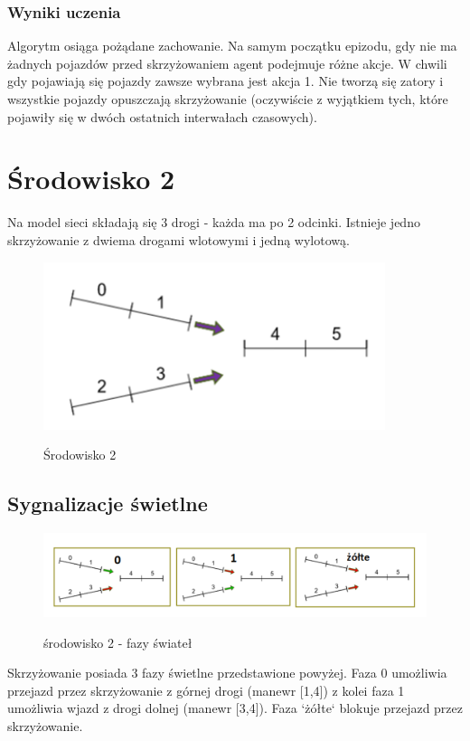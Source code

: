 \documentclass[12pt]{book}
\theoremstyle{plain}
\begin{document}
\subsubsection{Wyniki uczenia}
Algorytm osiąga pożądane zachowanie. Na samym początku epizodu, gdy nie ma żadnych pojazdów przed skrzyżowaniem agent podejmuje różne akcje. W chwili gdy pojawiają się pojazdy zawsze wybrana jest akcja 1. Nie tworzą się zatory i wszystkie pojazdy opuszczają skrzyżowanie (oczywiście z wyjątkiem tych, które pojawiły się w dwóch ostatnich interwałach czasowych).
\section{Środowisko 2}
Na model sieci składają się 3 drogi - każda ma po 2 odcinki. Istnieje jedno skrzyżowanie z dwiema drogami wlotowymi i jedną wylotową.
	\begin{figure}[H]
	\centering
	\includegraphics[width=10cm]{images/env_14}
	\label{fig:env_14}
	\caption{Środowisko 2}
\end{figure}

\subsection{Sygnalizacje świetlne}	
\begin{figure}[H]
	\centering
	\includegraphics[width=17cm]{images/env_14_fazy}
	\label{fig:env_14_fazy}
	\caption{środowisko 2 - fazy świateł}
\end{figure}\noindent
Skrzyżowanie posiada 3 fazy świetlne przedstawione powyżej. Faza 0 umożliwia przejazd przez skrzyżowanie z górnej drogi (manewr [1,4]) z kolei faza 1 umożliwia wjazd z drogi dolnej (manewr [3,4]). Faza `żółte` blokuje przejazd przez skrzyżowanie.
\end{document}
